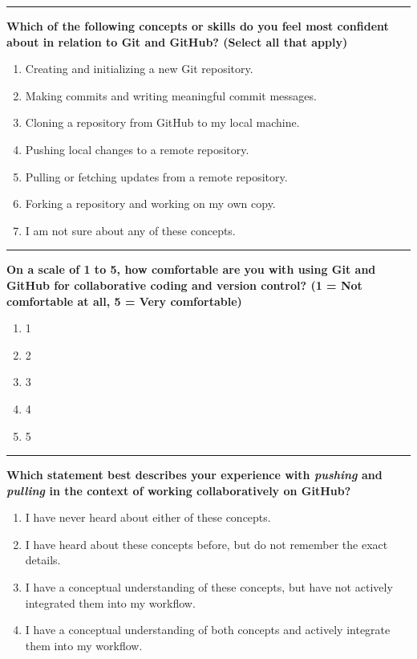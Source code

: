 \documentclass[
  letterpaper,
  DIV=11,
  numbers=noendperiod]{scrartcl}
\begin{document}
\begin{center}\rule{0.5\linewidth}{0.5pt}\end{center}

\textbf{Which of the following concepts or skills do you feel most
confident about in relation to Git and GitHub? (Select all that apply)}

\begin{enumerate}
\def\labelenumi{\alph{enumi}.}
\item
  Creating and initializing a new Git repository.
\item
  Making commits and writing meaningful commit messages.
\item
  Cloning a repository from GitHub to my local machine.
\item
  Pushing local changes to a remote repository.
\item
  Pulling or fetching updates from a remote repository.
\item
  Forking a repository and working on my own copy.
\item
  I am not sure about any of these concepts.
\end{enumerate}

\begin{center}\rule{0.5\linewidth}{0.5pt}\end{center}

\textbf{On a scale of 1 to 5, how comfortable are you with using Git and
GitHub for collaborative coding and version control? (1 = Not
comfortable at all, 5 = Very comfortable)}

\begin{enumerate}
\def\labelenumi{\alph{enumi}.}
\item
  1
\item
  2
\item
  3
\item
  4
\item
  5
\end{enumerate}

\begin{center}\rule{0.5\linewidth}{0.5pt}\end{center}

\textbf{Which statement best describes your experience with
\emph{pushing} and \emph{pulling} in the context of working
collaboratively on GitHub?}

\begin{enumerate}
\def\labelenumi{\alph{enumi}.}
\item
  I have never heard about either of these concepts.
\item
  I have heard about these concepts before, but do not remember the
  exact details.
\item
  I have a conceptual understanding of these concepts, but have not
  actively integrated them into my workflow.
\item
  I have a conceptual understanding of both concepts and actively
  integrate them into my workflow.
\end{enumerate}
\end{document}
